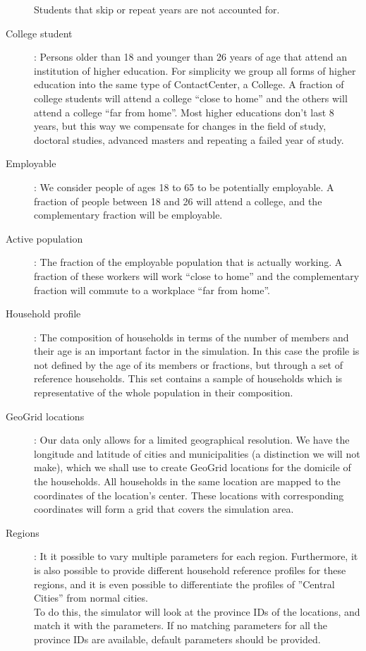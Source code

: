 \begin{description}
    		Students that skip or repeat years are not accounted for.
    \item[College student]:
        Persons older than 18 and younger than 26 years of age that attend an institution of higher education. 
        For simplicity we group all forms of higher education into the same type of ContactCenter, a College. 
        A fraction of college students will attend a college ``close to home'' and the others will attend a 
        college ``far from home''. Most higher educations don't last 8 years, but this way we compensate 
        for changes in the field of study, doctoral studies, advanced masters and repeating a failed year of study.
    \item[Employable]:
        We consider people of ages 18 to 65 to be potentially employable. A fraction of people between 18 and 26 
        will attend a college, and the complementary fraction will be employable.
    \item[Active population]:
        The fraction of the employable population that is actually working. A fraction of these workers will 
        work ``close to home'' and the complementary fraction will commute to a workplace ``far from home''.
    \item[Household profile]:
        The composition of households in terms of the number of members and their age is an important 
        factor in the simulation. In this case the profile is not defined by the age of its members or fractions, 
        but through a set of reference households. This set contains a sample of households which is 
        representative of the whole population in their composition.
    \item[GeoGrid locations]:
        Our data only allows for a limited geographical resolution. We have the longitude and latitude of cities 
        and municipalities (a distinction we will not make), which we shall use to create GeoGrid locations for 
        the domicile of the households. All households in the same location are mapped to the coordinates 
        of the location's center. These locations with corresponding coordinates will form a grid that covers 
        the simulation area.
    \item[Regions]:
         It it possible to vary multiple parameters for each region.  Furthermore, it  is  also  possible  to  provide  different  household  reference  profiles  for  these regions, and it is even possible to differentiate the profiles of ”Central Cities” from normal cities.\\
        To do this, the simulator will look at the province IDs of the locations, and match it with the parameters. If no matching parameters for all the province IDs are available, default parameters should be provided.

\end{description}

